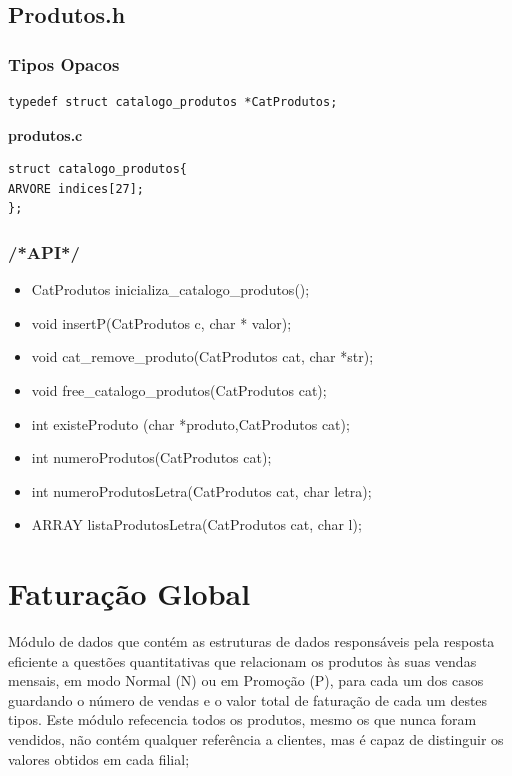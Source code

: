 \subsection{Produtos.h}

\subsubsection{Tipos Opacos}
\begin{verbatim}
typedef struct catalogo_produtos *CatProdutos;
\end{verbatim}

\textbf{produtos.c}

\begin{verbatim}
struct catalogo_produtos{
ARVORE indices[27];
};
\end{verbatim}

\subsubsection{/*API*/}

\begin{itemize}
	
\item CatProdutos inicializa\_catalogo\_produtos();
\item void insertP(CatProdutos c, char * valor);
\item void cat\_remove\_produto(CatProdutos cat, char *str);
\item void free\_catalogo\_produtos(CatProdutos cat);
\item int existeProduto (char *produto,CatProdutos cat);
\item int numeroProdutos(CatProdutos cat);
\item int numeroProdutosLetra(CatProdutos cat, char letra);
\item ARRAY listaProdutosLetra(CatProdutos cat, char l);
\end{itemize}


\section{Faturação Global}

Módulo de dados que contém as estruturas de dados responsáveis pela resposta eficiente a questões quantitativas que relacionam os produtos às suas vendas mensais, em modo Normal (N) ou em Promoção (P), para cada um dos casos guardando o número de vendas e o valor total de faturação de cada um destes tipos. Este módulo refecencia todos os produtos, mesmo os que nunca foram vendidos, não contém qualquer referência a clientes, mas é capaz de distinguir os valores obtidos em cada filial; 

